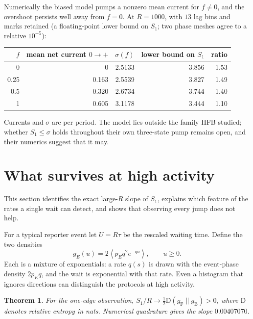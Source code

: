 \documentclass[11pt,a4paper]{article}
\newtheorem{theorem}{Theorem}
\newcommand{\av}[1]{\left\langle #1\right\rangle}
\newcommand{\KL}{\mathrm D}
\newcommand{\F}{\mathrm F}
\newcommand{\B}{\mathrm B}
\begin{document}
Numerically the biased model pumps a nonzero mean current for $f\ne0$, and the overshoot persists well away from $f=0$. At $R=1000$, with $13$ lag bins and marks retained (a floating-point lower bound on $S_1$; two phase meshes agree to a relative $10^{-5}$):
\begin{center}
\begin{tabular}{rrrrr}\toprule
$f$ & mean net current $0\to+$ & $\sigma(f)$ & lower bound on $S_1$ & ratio\\\midrule
0 & 0 & 2.5133 & 3.856 & 1.53\\
0.25 & 0.163 & 2.5539 & 3.827 & 1.49\\
0.5 & 0.320 & 2.6734 & 3.744 & 1.40\\
1 & 0.605 & 3.1178 & 3.444 & 1.10\\\bottomrule
\end{tabular}
\end{center}
Currents and $\sigma$ are per period. The model lies outside the family HFB studied; whether $S_1\le\sigma$ holds throughout their own three-state pump remains open, and their numerics suggest that it may.

\section{What survives at high activity}\label{sec:high}
This section identifies the exact large-$R$ slope of $S_1$, explains which feature of the rates a single wait can detect, and shows that observing every jump does not help.

For a typical reporter event let $U=R\tau$ be the rescaled waiting time. Define the two densities
\begin{equation}
 g_E(u)=2\av{p_E q^2 e^{-qu}},\qquad u\geq 0 .\label{eq:mix}
\end{equation}
Each is a mixture of exponentials: a rate $q(s)$ is drawn with the event-phase density $2p_Eq$, and the wait is exponential with that rate. Even a histogram that ignores directions can distinguish the protocols at high activity.

\begin{theorem}\label{th:slope}
For the one-edge observation, $S_1/R\to \tfrac12\KL(g_\F\|g_\B)>0$, where $\KL$ denotes relative entropy in nats. Numerical quadrature gives the slope $0.00407070$.
\end{theorem}
\end{document}
